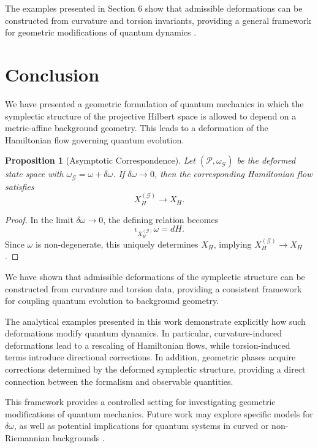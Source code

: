 \documentclass[11pt, a4paper]{article}
\newtheorem{proposition}[theorem]{Proposition}
\begin{document}
The examples presented in Section 6 show that admissible deformations can
be constructed from curvature and torsion invariants, providing a general
framework for geometric modifications of quantum dynamics
\cite{uhlmann1986,uhlmann1991}.

\section{Conclusion}

We have presented a geometric formulation of quantum mechanics in which the
symplectic structure of the projective Hilbert space is allowed to depend
on a metric-affine background geometry. This leads to a deformation of the
Hamiltonian flow governing quantum evolution.

\begin{proposition}[Asymptotic Correspondence]
Let $(\mathcal{P}, \omega_{\mathcal{G}})$ be the deformed state space with
$\omega_{\mathcal{G}} = \omega + \delta\omega$. If $\delta\omega \to 0$,
then the corresponding Hamiltonian flow satisfies
\[
X_H^{(\mathcal{G})} \to X_H.
\]
\end{proposition}

\begin{proof}
In the limit $\delta\omega \to 0$, the defining relation becomes
\[
\iota_{X_H^{(\mathcal{G})}} \omega = dH.
\]
Since $\omega$ is non-degenerate, this uniquely determines $X_H$, implying
$X_H^{(\mathcal{G})} \to X_H$ \cite{heydari2015,dirac1958}.
\end{proof}

We have shown that admissible deformations of the symplectic structure
can be constructed from curvature and torsion data, providing a consistent
framework for coupling quantum evolution to background geometry.

The analytical examples presented in this work demonstrate explicitly how
such deformations modify quantum dynamics. In particular, curvature-induced
deformations lead to a rescaling of Hamiltonian flows, while torsion-induced
terms introduce directional corrections. In addition, geometric phases
acquire corrections determined by the deformed symplectic structure,
providing a direct connection between the formalism and observable
quantities.

This framework provides a controlled setting for investigating geometric
modifications of quantum mechanics. Future work may explore specific models
for $\delta\omega$, as well as potential implications for quantum systems
in curved or non-Riemannian backgrounds \cite{bekenstein1981,hegerfeldt2013}.
\end{document}
